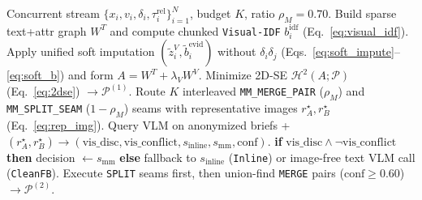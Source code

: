 \begin{algorithm}[t]
\caption{\textbf{Evid-MSED}: Conflict-Gated Two-Stage Multimodal SED}
\label{alg:evid_msed}
\begin{algorithmic}[1]
\REQUIRE Concurrent stream $\{x_i, v_i, \delta_i, \tau^{\text{rel}}_i\}_{i=1}^N$, budget $K$, ratio $\rho_M=0.70$.
\STATE Build sparse text+attr graph $W^T$ and compute chunked \texttt{Visual-IDF} $b_i^{\text{idf}}$ (Eq.~\ref{eq:visual_idf}).
\STATE Apply unified soft imputation $(\tilde{z}_i^V, \tilde{b}_i^{\text{evid}})$ without $\delta_i\delta_j$ (Eqs.~\ref{eq:soft_impute}--\ref{eq:soft_b}) and form $A = W^T + \lambda_V W^V$.
\STATE Minimize 2D-SE $\mathcal{H}^2(A; \mathcal{P})$ (Eq.~\ref{eq:2dse}) $\to \mathcal{P}^{(1)}$.
\STATE Route $K$ interleaved \texttt{MM\_MERGE\_PAIR} ($\rho_M$) and \texttt{MM\_SPLIT\_SEAM} ($1-\rho_M$) seams with representative images $r^\star_A, r^\star_B$ (Eq.~\ref{eq:rep_img}).
  \STATE Query VLM on anonymized briefs + $(r^\star_A, r^\star_B) \to (\text{vis\_disc}, \text{vis\_conflict}, s_{\text{inline}}, s_{\text{mm}}, \text{conf})$.
  \STATE \textbf{if} $\text{vis\_disc} \wedge \neg\text{vis\_conflict}$ \textbf{then} decision $\leftarrow s_{\text{mm}}$
  \STATE \textbf{else} fallback to $s_{\text{inline}}$ (\texttt{Inline}) or image-free text VLM call (\texttt{CleanFB}).
\ENDFOR
\STATE Execute \texttt{SPLIT} seams first, then union-find \texttt{MERGE} pairs ($\text{conf} \ge 0.60$) $\to \mathcal{P}^{(2)}$.
\end{algorithmic}
\end{algorithm}
